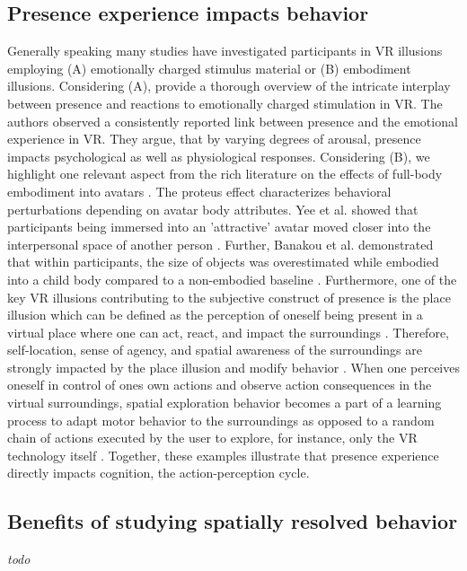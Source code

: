 \subsection{Presence experience impacts behavior}
Generally speaking many studies have investigated participants in VR illusions employing (A) emotionally charged stimulus material or (B) embodiment illusions. Considering (A), \cite{Diemer2015} provide a thorough overview of the intricate interplay between presence and reactions to emotionally charged stimulation in VR. The authors observed a consistently reported link between presence and the emotional experience in VR. They argue, that by varying degrees of arousal, presence impacts psychological as well as physiological responses. Considering (B), we highlight one relevant aspect from the rich literature on the effects of full-body embodiment into avatars \cite{Maister2015}. The proteus effect characterizes behavioral perturbations depending on avatar body attributes. Yee et al. showed that participants being immersed into an 'attractive' avatar moved closer into the interpersonal space of another person \cite{Yee2007}. Further, Banakou et al. demonstrated that within participants, the size of objects was overestimated while embodied into a child body compared to a non-embodied baseline \cite{Banakou2013}. Furthermore, one of the key VR illusions contributing to the subjective construct of presence is the place illusion which can be defined as the perception of oneself being present in a virtual place where one can act, react, and impact the surroundings \cite{Slater2009}. Therefore, self-location, sense of agency, and spatial awareness of the surroundings are strongly impacted by the place illusion and modify behavior \cite{Kilteni2012}. When one perceives oneself in control of ones own actions and observe action consequences in the virtual surroundings, spatial exploration behavior becomes a part of a learning process to adapt motor behavior to the surroundings as opposed to a random chain of actions executed by the user to explore, for instance, only the VR technology itself \cite{Tan2011}. Together, these examples illustrate that presence experience directly impacts cognition, the action-perception cycle.

\subsection{Benefits of studying spatially resolved behavior}
\textit{todo}


